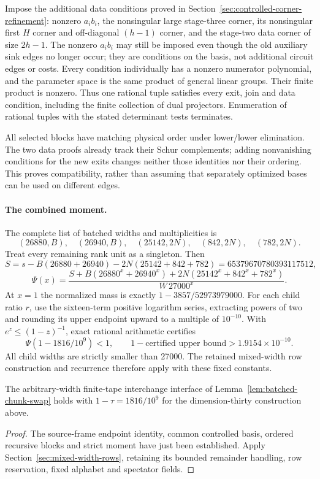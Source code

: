 Impose the additional data conditions proved in
Section~\ref{sec:controlled-corner-refinement}: nonzero $a_i b_i$, the
nonsingular large stage-three corner, its nonsingular first $H$ corner
and off-diagonal $(h-1)$ corner, and the stage-two data corner of size
$2h-1$. The nonzero $a_i b_i$ may still be imposed even though the old
auxiliary sink edges no longer occur; they are conditions on the basis,
not additional circuit edges or costs. Every condition individually has
a nonzero numerator polynomial, and the parameter space is the same
product of general linear groups. Their finite product is nonzero.
Thus one rational tuple satisfies every exit, join and data condition,
including the finite collection of dual projectors. Enumeration of
rational tuples with the stated determinant tests terminates.

All selected blocks have matching physical order under lower/lower
elimination. The two data proofs already track their Schur complements;
adding nonvanishing conditions for the new exits changes neither those
identities nor their ordering. This proves compatibility, rather than
assuming that separately optimized bases can be used on different edges.

\paragraph{The combined moment.}
The complete list of batched widths and multiplicities is
\[
 (26880,B),\quad(26940,B),\quad(25142,2N),\quad(842,2N),\quad(782,2N).
\]
Treat every remaining rank unit as a singleton. Then
\[
 S=s-B(26880+26940)-2N(25142+842+782)
   =65379670780393117512,
\]
\[
 \Psi(x)=\frac{S+B(26880^x+26940^x)
                 +2N(25142^x+842^x+782^x)}{W\,27000^x}.
\]
At $x=1$ the normalized mass is exactly $1-3857/52973979000$.
For each child ratio $r$, use the sixteen-term positive logarithm series,
extracting powers of two and rounding its upper endpoint upward to a
multiple of $10^{-10}$. With $e^z\le(1-z)^{-1}$, exact rational arithmetic
certifies
\[
 \Psi(1-1816/10^9)<1,\qquad
 1-\text{certified upper bound}>1.9154\times10^{-10}.
\]
All child widths are strictly smaller than 27000. The retained mixed-width
row construction and recurrence therefore apply with these fixed constants.

\begin{lemma}
\label{lem:source-corner-chunk-swap}
The arbitrary-width finite-tape interchange interface of
Lemma~\ref{lem:batched-chunk-swap} holds with
$1-\tau=1816/10^9$ for the dimension-thirty construction above.
\end{lemma}
\begin{proof}
The source-frame endpoint identity, common controlled basis, ordered
recursive blocks and strict moment have just been established. Apply
Section~\ref{sec:mixed-width-rows}, retaining its bounded remainder
handling, row reservation, fixed alphabet and spectator fields.
\end{proof}
